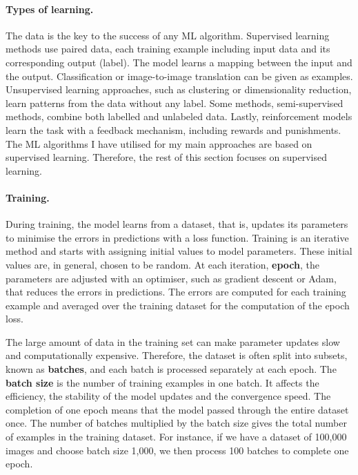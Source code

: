 \paragraph{Types of learning.} The data is the key to the success of any \gls{ML} algorithm. Supervised learning methods use paired data, each training example including input data and its corresponding output (label). The model learns a mapping between the input and the output. Classification or image-to-image translation can be given as examples. Unsupervised learning approaches, such as clustering or dimensionality reduction, learn patterns from the data without any label. Some methods, semi-supervised methods, combine both labelled and unlabeled data. Lastly, reinforcement models learn the task with a feedback mechanism, including rewards and punishments. The ML algorithms I have utilised for my main approaches are based on supervised learning. Therefore, the rest of this section focuses on supervised learning.

\paragraph{Training.} During training, the model learns from a dataset, that is, updates its parameters to minimise the errors in predictions with a loss function. Training is an iterative method and starts with assigning initial values to model parameters. These initial values are, in general, chosen to be random. At each iteration, \textbf{epoch}, the parameters are adjusted with an optimiser, such as gradient descent or Adam, that reduces the errors in predictions. The errors are computed for each training example and averaged over the training dataset for the computation of the epoch loss. 

The large amount of data in the training set can make parameter updates slow and computationally expensive. Therefore, the dataset is often split into subsets, known as \textbf{batches}, and each batch is processed separately at each epoch. The \textbf{batch size} is the number of training examples in one batch. It affects the efficiency, the stability of the model updates and the convergence speed. The completion of one epoch means that the model passed through the entire dataset once. The number of batches multiplied by the batch size gives the total number of examples in the training dataset. For instance, if we have a dataset of 100,000 images and choose batch size 1,000, we then process 100 batches to complete one epoch. 

